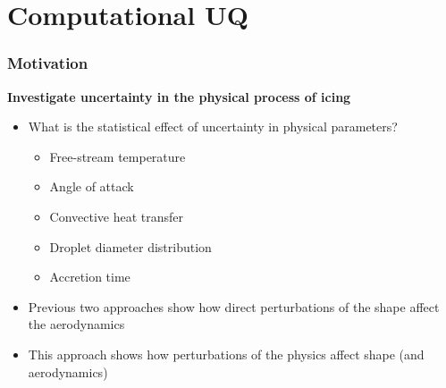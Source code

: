 \documentclass[9pt]{beamer}
\begin{document}
\section{Computational UQ}
\label{sec-4}
\begin{frame}
\frametitle{Motivation}
\label{sec-4-1}

\textbf{Investigate uncertainty in the physical process of icing}
\begin{itemize}
\item What is the statistical effect of uncertainty in physical parameters?
\begin{itemize}
\item Free-stream temperature
\item Angle of attack
\item Convective heat transfer
\item Droplet diameter distribution
\item Accretion time
\end{itemize}
\item Previous two approaches show how direct perturbations of the shape
    affect the aerodynamics
\item This approach shows how perturbations of the physics affect shape
    (and aerodynamics)
\end{itemize}
\end{frame}
\end{document}
